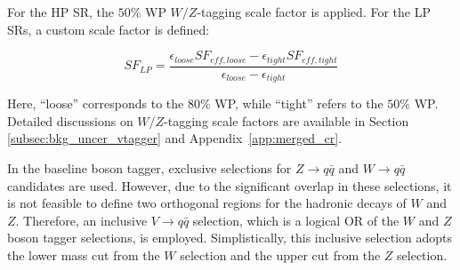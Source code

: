 For the HP SR, the $50\%$ WP $W/Z$-tagging scale factor is applied. For the LP SRs, a custom scale factor is defined:

    \begin{equation}
    SF_{LP} = \frac{\epsilon_{loose}SF_{eff,loose}- \epsilon_{tight}SF_{eff,tight} }{ \epsilon_{loose}- \epsilon_{tight}}
    \end{equation}

Here, ``loose'' corresponds to the $80\%$ WP, while ``tight'' refers to the $50\%$ WP. Detailed discussions on $W/Z$-tagging scale factors are available in Section \ref{subsec:bkg_uncer_vtagger} and Appendix~\ref{app:merged_cr}.

In the baseline boson tagger, exclusive selections for $Z \to q\bar{q}$ and $W \to q\bar{q}$ candidates are used. However, due to the significant overlap in these selections, it is not feasible to define two orthogonal regions for the hadronic decays of $W$ and $Z$. Therefore, an inclusive $V \to q\bar{q}$ selection, which is a logical OR of the $W$ and $Z$ boson tagger selections, is employed. Simplistically, this inclusive selection adopts the lower mass cut from the $W$ selection and the upper cut from the $Z$ selection.

